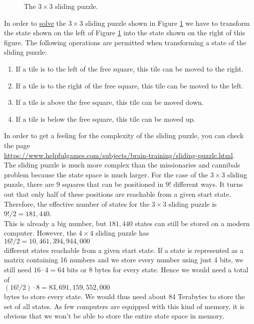 \begin{figure}[!ht]
\centering
{}
\caption{The $3 \times 3$ sliding puzzle.}
\label{fig:8-puzzle.pdf}
\end{figure}

In order to \href{http://www.artbylogic.com/puzzles/numSlider/numberShuffle.htm?rows=3&cols=3&sqr=1}{solve} the $3 \times 3$ sliding puzzle shown in Figure \ref{fig:8-puzzle.pdf} we have to
transform the state shown on the left of Figure \ref{fig:8-puzzle.pdf} into the state shown on the
right of this figure.  The following operations are permitted when transforming a state of the
sliding puzzle:
\begin{enumerate}
\item If a tile is to the left  of the free square, this tile can be moved to the right.
\item If a tile is to the right of the free square, this tile can be moved to the left.
\item If a tile is above           the free square, this tile can be moved down.
\item If a tile is below           the free square, this tile can be moved up.
\end{enumerate}
In order to get a feeling for the complexity of the sliding puzzle, you can check the page
\\[0.2cm]
\hspace*{1.3cm}
\href{https://www.helpfulgames.com/subjects/brain-training/sliding-puzzle.html}{https://www.helpfulgames.com/subjects/brain-training/sliding-puzzle.html}.
\\[0.2cm]
The sliding puzzle is much more complex than the missionaries and cannibals problem because the
state space is much larger.  For the case of the $3 \times 3$ sliding puzzle, there are 9 squares
that can be positioned in $9!$ different ways.  It turns out that only half of these positions are
reachable from a given start state.  Therefore, the effective number of states for the $3 \times 3$
sliding puzzle is
\\[0.2cm]
\hspace*{1.3cm}
$9! / 2 = 181,440$.
\\[0.2cm]
This is already a big number, but $181,440$ states can still be stored on a modern computer.  However, the
$4 \times 4$ sliding puzzle has
\\[0.2cm]
\hspace*{1.3cm}
$16!/2 = 10,461,394,944,000$
\\[0.2cm]
different states reachable from a given start state.  If a state is represented as a matrix containing
16 numbers and we store every number using just 4 bits, we still need $16 \cdot 4 = 64$ bits or 8
bytes for every state.  Hence we would need a total of
\\[0.2cm]
\hspace*{1.3cm}
$(16! / 2) \cdot 8 = 83,691,159,552,000$
\\[0.2cm]
bytes to store every state. We would thus need about 84 Terabytes to store the set of all states.  As few
computers are equipped with this kind of memory, it is obvious that we won't be able to store the
entire state space in memory.

